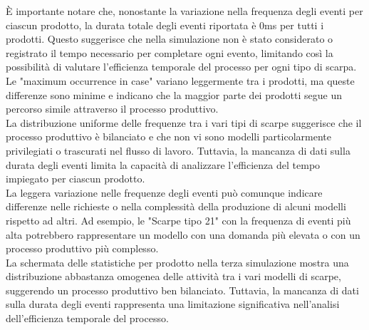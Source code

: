 \documentclass{article}
\begin{document}
È importante notare che, nonostante la variazione nella frequenza degli eventi per ciascun prodotto, la durata totale degli eventi riportata è 0ms per tutti i prodotti. Questo suggerisce che nella simulazione non è stato considerato o registrato il tempo necessario per completare ogni evento, limitando così la possibilità di valutare l'efficienza temporale del processo per ogni tipo di scarpa.\\
Le "maximum occurrence in case" variano leggermente tra i prodotti, ma queste differenze sono minime e indicano che la maggior parte dei prodotti segue un percorso simile attraverso il processo produttivo.\\
La distribuzione uniforme delle frequenze tra i vari tipi di scarpe suggerisce che il processo produttivo è bilanciato e che non vi sono modelli particolarmente privilegiati o trascurati nel flusso di lavoro. Tuttavia, la mancanza di dati sulla durata degli eventi limita la capacità di analizzare l'efficienza del tempo impiegato per ciascun prodotto.\\
La leggera variazione nelle frequenze degli eventi può comunque indicare differenze nelle richieste o nella complessità della produzione di alcuni modelli rispetto ad altri. Ad esempio, le "Scarpe tipo 21" con la frequenza di eventi più alta potrebbero rappresentare un modello con una domanda più elevata o con un processo produttivo più complesso.\\
La schermata delle statistiche per prodotto nella terza simulazione mostra una distribuzione abbastanza omogenea delle attività tra i vari modelli di scarpe, suggerendo un processo produttivo ben bilanciato. Tuttavia, la mancanza di dati sulla durata degli eventi rappresenta una limitazione significativa nell'analisi dell'efficienza temporale del processo.
\end{document}
